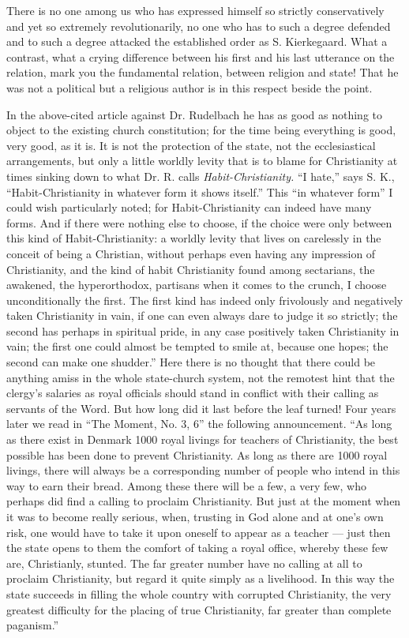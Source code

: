 \documentclass[12pt,a4paper,openany]{book}
\newcommand{\opage}[1]{\marginnote{\footnotesize\textit{[#1]}}}
\begin{document}
There is no one among us who has expressed himself so strictly
conservatively and yet so extremely revolutionarily, no one who
has to such a degree defended and to such a degree attacked the
established order as S. Kierkegaard. What a contrast,
what a crying difference between his first and
his last utterance on the relation, mark you the fundamental relation,
between religion and state! That he was not
a political but a religious author is in this respect
beside the point.

In the above-cited article against Dr. Rudelbach he has
as good as nothing to object to the existing
church constitution; for the time being everything is good, very good,
as it is. It is not the protection of the state, not
the ecclesiastical arrangements, but only a little worldly
levity that is to blame for Christianity at times
\setcounter{footnote}{0}%
\opage{20}sinking down to what Dr. R. calls \emph{Habit-Christianity.}
``I hate,'' says S. K., ``Habit-Christianity
in whatever form it shows itself.''
This ``in whatever form'' I could wish
particularly noted; for Habit-Christianity can indeed
have many forms. And if there were nothing else to
choose, if the choice were only between this kind of Habit-Christianity:
a worldly levity that lives on carelessly in
the conceit of being a Christian, without perhaps even
having any impression of Christianity, and the kind of
habit Christianity found among sectarians, the awakened,
the hyperorthodox, partisans when it comes to the crunch,
I choose unconditionally the first. The first kind has indeed
only frivolously and negatively taken Christianity in vain,
if one can even always dare to judge it
so strictly; the second has perhaps in spiritual
pride, in any case positively taken Christianity
in vain; the first one could almost be tempted to
smile at, because one hopes; the second can make one
shudder.'' Here there is no thought that there could be
anything amiss in the whole state-church system, not the remotest
hint that the clergy's salaries as royal
officials should stand in conflict with their calling
as servants of the Word. But how long did it last
before the leaf turned! Four years later we read in
``The Moment, No. 3, 6'' the following announcement. ``As long
as there exist in Denmark 1000 royal livings
for teachers of Christianity, the best possible has been done
to prevent Christianity. As long as there are 1000 royal
livings, there will always be a corresponding
number of people who intend in this way to
\setcounter{footnote}{0}%
\opage{21}earn their bread. Among these there will be a few,
a very few, who perhaps did find a calling to proclaim Christianity.
But just at the moment when it was to
become really serious, when, trusting in God alone and at one's own risk, one
would have to take it upon oneself to appear as a teacher --- just then the
state opens to them the comfort of taking a royal
office, whereby these few are, Christianly, stunted. The
far greater number have no calling at all to
proclaim Christianity, but regard it quite simply as
a livelihood. In this way the state succeeds in filling the whole
country with corrupted Christianity, the very greatest difficulty
for the placing of true Christianity, far
greater than complete paganism.''
\end{document}
